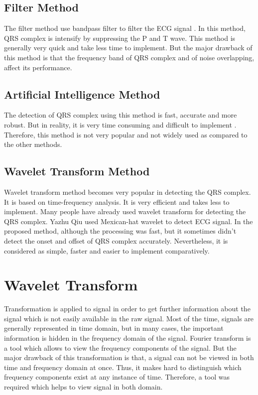 \subsection{Filter Method}
The filter method use bandpass filter to filter the ECG signal \cite{4122029}\cite{554762}. In this method, QRS complex is intensify by suppressing the P and T wave. This method is generally very quick and take less time to implement. But the major drawback of this method is that the frequency band of QRS complex and of noise overlapping, affect its performance.

\subsection{Artificial Intelligence Method}
The detection of QRS complex using this method is fast, accurate and more robust. But in reality, it is very time consuming and difficult to implement \cite{126604}\cite{PIETKA1991139}\cite{58593}. Therefore, this method is not very popular and not widely used as compared to the other methods.

\subsection{Wavelet Transform Method}
Wavelet transform method becomes very popular in detecting the QRS complex. It is based on time-frequency analysis. It is very efficient and takes less to implement. Many people have already used wavelet transform for detecting the QRS complex. Yazhu Qiu \cite{PMID:17228741} used Mexican-hat wavelet to detect ECG signal. In the proposed method, although the processing was fast, but it sometimes didn't detect the onset and offset of QRS complex accurately. Nevertheless, it is considered as simple, faster and easier to implement comparatively.

\section{Wavelet Transform}
Transformation is applied to signal in order to get further information about the signal which is not easily available in the raw signal. Most of the time, signals are generally represented in time domain, but in many cases, the important information is hidden in the frequency domain of the signal. Fourier transform is a tool which allows to view the frequency components of the signal. But the major drawback of this transformation is that, a signal can not be viewed in both time and frequency domain at once. Thus, it makes hard to distinguish which frequency components exist at any instance of time. Therefore, a tool was required which helps to view signal in both domain.

